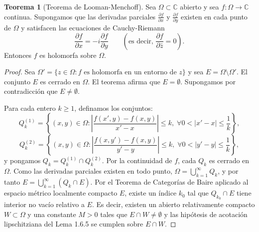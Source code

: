 \documentclass[11pt,a4paper]{article}
\theoremstyle{definition}
\newtheorem{teorema}{Teorema}[section]
\theoremstyle{remark}
\numberwithin{equation}{section}
\begin{document}
\begin{teorema}[Teorema de Looman-Menchoff]
Sea $\Omega \subset \mathbb{C}$ abierto y sea $f: \Omega \to \mathbb{C}$ continua. Supongamos que las derivadas parciales $\frac{\partial f}{\partial x}$ y $\frac{\partial f}{\partial y}$ existen en cada punto de $\Omega$ y satisfacen las ecuaciones de Cauchy-Riemann
\begin{equation}
\frac{\partial f}{\partial x} = -i \frac{\partial f}{\partial y} \qquad \left(\text{es decir, } \frac{\partial f}{\partial \bar{z}} = 0\right).
\end{equation}
Entonces $f$ es holomorfa sobre $\Omega$.
\end{teorema}
\begin{proof}
Sea $\Omega' = \{z \in \Omega : f \text{ es holomorfa en un entorno de } z\}$ y sea $E = \Omega \setminus \Omega'$. El conjunto $E$ es cerrado en $\Omega$. El teorema afirma que $E = \emptyset$.
Supongamos por contradicción que $E \neq \emptyset$.

Para cada entero $k \ge 1$, definamos los conjuntos:
\[
Q_k^{(1)} = \left\{ (x,y) \in \Omega : \left| \frac{f(x',y) - f(x,y)}{x'-x} \right| \le k, \; \forall 0 < |x'-x| \le \frac{1}{k} \right\},
\]
\[
Q_k^{(2)} = \left\{ (x,y) \in \Omega : \left| \frac{f(x,y') - f(x,y)}{y'-y} \right| \le k, \; \forall 0 < |y'-y| \le \frac{1}{k} \right\},
\]
y pongamos $Q_k = Q_k^{(1)} \cap Q_k^{(2)}$. Por la continuidad de $f$, cada $Q_k$ es cerrado en $\Omega$. Como las derivadas parciales existen en todo punto, $\Omega = \bigcup_{k=1}^\infty Q_k$, y por tanto $E = \bigcup_{k=1}^\infty (Q_k \cap E)$.
Por el Teorema de Categorías de Baire aplicado al espacio métrico localmente compacto $E$, existe un índice $k_0$ tal que $Q_{k_0} \cap E$ tiene interior no vacío relativo a $E$. Es decir, existen un abierto relativamente compacto $W \subset \Omega$ y una constante $M > 0$ tales que $E \cap W \neq \emptyset$ y las hipótesis de acotación lipschitziana del Lema 1.6.5 se cumplen sobre $E \cap W$.


\end{proof}
\end{document}
